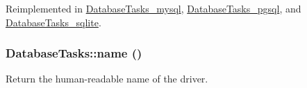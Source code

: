 Reimplemented in \hyperlink{classDatabaseTasks__mysql_a7f4a11fcaa8a2267767eb16547cf7c52}{DatabaseTasks\_\-mysql}, \hyperlink{classDatabaseTasks__pgsql_abf42cc0a5aa01ae5c146277419f394ae}{DatabaseTasks\_\-pgsql}, and \hyperlink{classDatabaseTasks__sqlite_ac546ff3ed7f1ece5726b3c5cd7a39ef9}{DatabaseTasks\_\-sqlite}.\hypertarget{classDatabaseTasks_ae582e57b43461aad87f47ad0d37b6c9a}{
\subsubsection[{name}]{\setlength{\rightskip}{0pt plus 5cm}DatabaseTasks::name ()}}
\label{classDatabaseTasks_ae582e57b43461aad87f47ad0d37b6c9a}
Return the human-\/readable name of the driver. 

